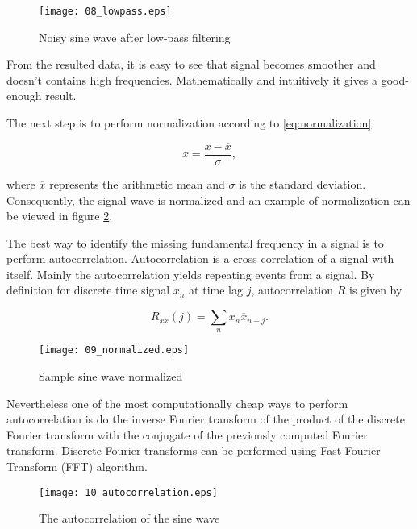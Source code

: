 \begin{figure}[!ht]
\centering
  \texttt{[image: 08\_lowpass.eps]}
\caption{Noisy sine wave after low-pass filtering}
\label{fig:lowpass}
\end{figure}

From the resulted data, it is easy to see that signal becomes smoother and doesn't contains high frequencies. Mathematically and intuitively it gives a good-enough result. 

The next step is to perform normalization according to \eqref{eq:normalization}.

\begin{equation} \label{eq:normalization}
 x = \frac{x - \overline{x}}{\sigma},
\end{equation}

\noindent
where $\overline{x}$ represents the arithmetic mean and $\sigma$ is the standard deviation. Consequently, the signal wave is normalized and an example of normalization can be viewed in figure \ref{fig:normalized}.

The best way to identify the missing fundamental frequency in a signal is to perform autocorrelation. Autocorrelation is a cross-correlation of a signal with itself. Mainly the autocorrelation yields repeating events from a signal. By definition for discrete time signal $x_n$ at time lag $j$, autocorrelation $R$ is given by

\begin{equation}\label{eq:accor}
 R_{xx}(j) = \sum_{n}x_n\overline{x}_{n-j}.
\end{equation}

\begin{figure}[!ht]
\centering
  \texttt{[image: 09\_normalized.eps]}
\caption{Sample sine wave normalized}
\label{fig:normalized}
\end{figure}

Nevertheless one of the most computationally cheap ways to perform autocorrelation is do the inverse Fourier transform of the product of the discrete Fourier transform with the conjugate of the previously computed Fourier transform. Discrete Fourier transforms can be performed using Fast Fourier Transform (FFT) algorithm.

\begin{figure}[!ht]
\centering
  \texttt{[image: 10\_autocorrelation.eps]}
\caption{The autocorrelation of the sine wave}
\label{fig:autocorrelation}
\end{figure}

